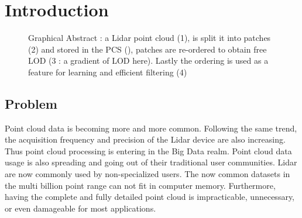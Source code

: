 

\section{Introduction}

\begin{figure}[t!]
	\begin{center}
		\caption{Graphical Abstract : a Lidar point cloud (1), is split it into patches (2) 
		and stored in the PCS (\cite{Cura2015}), patches are re-ordered to obtain free LOD 
		(3 : a gradient of LOD here).
		Lastly the ordering is used as a feature for learning and efficient filtering (4) } 
		\label{fig:banner_image}
	\end{center}
\end{figure} 

	\subsection{Problem}  
		Point cloud data is becoming more and more common. Following the same trend, the acquisition frequency and precision of the Lidar device are also increasing.
		Thus point cloud processing is entering in the Big Data realm.
		Point cloud data usage is also spreading and going out of their traditional user communities. 
		Lidar are now commonly used by non-specialized users. 
		The now common datasets in the multi billion point range can not fit in computer memory. 
		Furthermore, having the complete and fully detailed point cloud is impracticable, unnecessary, or even damageable for most applications.
		
